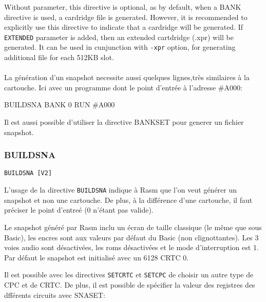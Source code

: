 \begin{xen}
Without parameter, this directive is optional, as by default, when a BANK directive is used, a cardridge file is generated. However, it is recommended to explicitly use this directive to indicate that a cardridge will be generated.
If \texttt{EXTENDED} parameter is added, then an extended cartdridge (.xpr) will be generated.
It can be used in cunjunction with \texttt{-xpr} option, for generating additional file for each 512KB slot.
\end{xen}

\paragraph{}

\begin{xfr}
La génération d'un snapshot necessite aussi quelques lignes,très similaires à la cartouche. Ici avec un programme dont le point d'entrée à l'adresse \#A000:
\end{xfr}

\begin{xen}
\end{xen}

\begin{code}
BUILDSNA
BANK 0
RUN \#A000
\end{code}

\begin{xfr}
Il est aussi possible d'utiliser la directive BANKSET pour generer un fichier snapshot.
\end{xfr}

\subsubsection{BUILDSNA}
\begin{verbatim}
BUILDSNA [V2]
\end{verbatim}

\begin{xfr}
L'usage de la directive \texttt{BUILDSNA} indique à Rasm que l'on veut générer un snapshot et non une cartouche.  De plus, à la différence d'une cartouche, il faut préciser le point d'entreé (0 n'étant pas valide).

Le snapshot généré par Rasm inclu un écran de taille classique (le même que sous Basic), les encres sont aux valeurs par défaut du Basic (non clignottantes). Les 3 voies audio sont désactivées, les roms désactivées et le mode d'interruption est 1.
Par défaut le snapshot est initialisé avec un 6128 CRTC 0.

Il est possible avec les directives \texttt{SETCRTC} et \texttt{SETCPC} de choisir un autre type de CPC et de CRTC.
De plus, il est possible de spécifier la valeur des registres des dfférents circuits avec SNASET:
\end{xfr}

